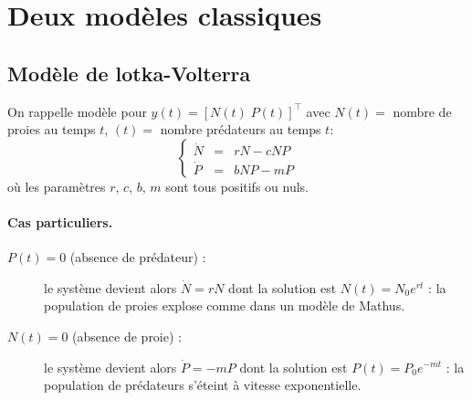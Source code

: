 \section{Deux modèles classiques}


\subsection{Modèle de lotka-Volterra}

On rappelle modèle pour $y(t) = [N(t) \; P(t)]^\top$ avec $N(t) =$ nombre de proies au temps $t$, $(t) = $ nombre prédateurs au temps $t$:
$$
\left\{ \begin{array}{rcl} 
  \dot N & = & r N - c N P \\
  \dot P & = & b N P  - m P
\end{array} \right.
$$
où les paramètres $r$, $c$, $b$, $m$ sont tous positifs ou nuls.

\paragraph*{Cas particuliers.}
\begin{description}
  \item[$P(t) = 0 $ (absence de prédateur) :] le système devient alors $\dot N = r N$ dont la solution est $N(t) = N_0 e^{rt}$ : la population de proies explose comme dans un modèle de Mathus.
  \item[$N(t) = 0 $ (absence de proie) :] le système devient alors $\dot P = - m P$ dont la solution est $P(t) = P_0 e^{-mt}$ : la population de prédateurs s'éteint à vitesse exponentielle.
\end{description}

